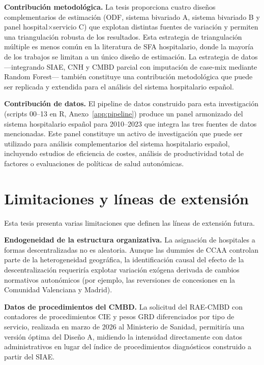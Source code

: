 \textbf{Contribución metodológica.} La tesis proporciona cuatro diseños complementarios de estimación (ODF, sistema bivariado A, sistema bivariado B y panel hospital$\times$servicio C) que explotan distintas fuentes de variación y permiten una triangulación robusta de los resultados. Esta estrategia de triangulación múltiple es menos común en la literatura de SFA hospitalario, donde la mayoría de los trabajos se limitan a un único diseño de estimación. La estrategia de datos ---integrando SIAE, CNH y CMBD parcial con imputación de case-mix mediante Random Forest--- también constituye una contribución metodológica que puede ser replicada y extendida para el análisis del sistema hospitalario español.

\textbf{Contribución de datos.} El pipeline de datos construido para esta investigación (scripts 00--13 en R, Anexo~\ref{app:pipeline}) produce un panel armonizado del sistema hospitalario español para 2010--2023 que integra las tres fuentes de datos mencionadas. Este panel constituye un activo de investigación que puede ser utilizado para análisis complementarios del sistema hospitalario español, incluyendo estudios de eficiencia de costes, análisis de productividad total de factores o evaluaciones de políticas de salud autonómicas.

\section{Limitaciones y líneas de extensión}

Esta tesis presenta varias limitaciones que definen las líneas de extensión futura.

\textbf{Endogeneidad de la estructura organizativa.} La asignación de hospitales a formas descentralizadas no es aleatoria. Aunque las dummies de CCAA controlan parte de la heterogeneidad geográfica, la identificación causal del efecto de la descentralización requeriría explotar variación exógena derivada de cambios normativos autonómicos (por ejemplo, las reversiones de concesiones en la Comunidad Valenciana y Madrid).

\textbf{Datos de procedimientos del CMBD.} La solicitud del RAE-CMBD con contadores de procedimientos CIE y pesos GRD diferenciados por tipo de servicio, realizada en marzo de 2026 al Ministerio de Sanidad, permitiría una versión óptima del Diseño A, midiendo la intensidad directamente con datos administrativos en lugar del índice de procedimientos diagnósticos construido a partir del SIAE.

